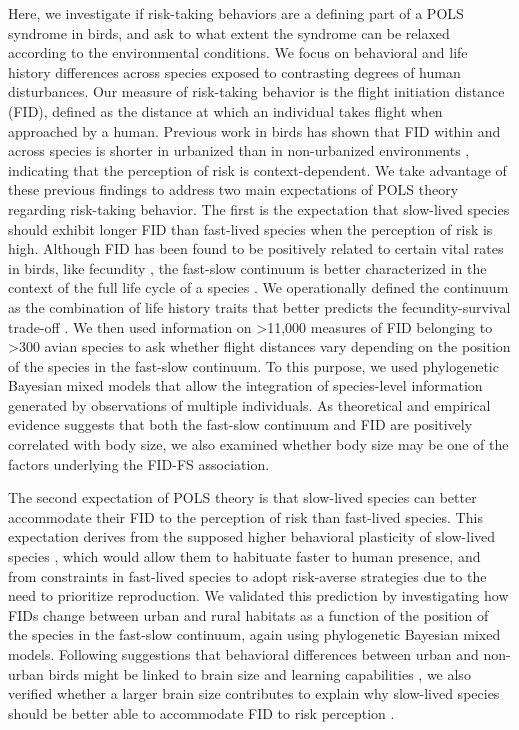 Here, we investigate if risk-taking behaviors are a defining
part of a POLS syndrome in birds, and ask to what extent the
syndrome can be relaxed according to the environmental conditions.
We focus on behavioral and life history differences
across species exposed to contrasting degrees of human disturbances.
Our measure of risk-taking behavior is the flight
initiation distance (FID), defined as the distance at which an
individual takes flight when approached by a human. Previous
work in birds has shown that FID within and across species is
shorter in urbanized than in non-urbanized environments
\citep{Moller2008, Carrete2011, Sol2012b},
indicating that the perception of risk is context-dependent. We
take advantage of these previous findings to address two main
expectations of POLS theory regarding risk-taking behavior.
The first is the expectation that slow-lived species should exhibit
longer FID than fast-lived species when the perception of
risk is high. Although FID has been found to be positively
related to certain vital rates in birds, like fecundity \citep{Blumstein2006, Moller2012}, 
the fast-slow continuum
is better characterized in the context of the full life cycle of a
species \citep{Adler2014}. We operationally defined the continuum
as the combination of life history traits that better
predicts the fecundity-survival trade-off \citep{Caswell2000, Oli2003, Oli2004}. 
We then used information on
\textgreater{11,000} measures of FID belonging to \textgreater{300} avian species to
ask whether flight distances vary depending on the position of
the species in the fast-slow continuum. To this purpose, we
used phylogenetic Bayesian mixed models that allow the integration
of species-level information generated by observations
of multiple individuals. As theoretical and empirical evidence
suggests that both the fast-slow continuum \citep{stearns1992evolution} 
and FID \citep{Moller2015} are positively correlated with
body size, we also examined whether body size may be one of
the factors underlying the FID-FS association.

The second expectation of POLS theory is that slow-lived
species can better accommodate their FID to the perception of
risk than fast-lived species. This expectation derives from the
supposed higher behavioral plasticity of slow-lived species
\citep{Sol2009}, which would allow them to habituate faster to
human presence, and from constraints in fast-lived species to
adopt risk-averse strategies due to the need to prioritize reproduction.
We validated this prediction by investigating how
FIDs change between urban and rural habitats as a function
of the position of the species in the fast-slow continuum, again
using phylogenetic Bayesian mixed models. Following suggestions
that behavioral differences between urban and non-urban
birds might be linked to brain size and learning capabilities
\citep{Kark2007, Maklakov2011, Sol2011}, 
we also verified whether a larger brain size contributes
to explain why slow-lived species should be better able to
accommodate FID to risk perception \citep{Sol2009a, Sol2009}.


